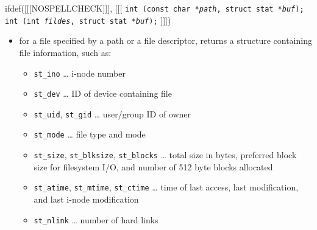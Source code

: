 

\begin{slide}
\setlength{\baselineskip}{0.9\baselineskip}
ifdef([[[NOSPELLCHECK]]], [[[
\texttt{int (const char *\emph{path}, struct stat *\emph{buf});\\
int (int \emph{fildes}, struct stat *\emph{buf});}
]]])
\begin{itemize}
\item for a file specified by a path or a file descriptor, returns a structure
containing file information, such as:
\begin{itemize}
\item \texttt{st\_ino} \dots{} i-node number
\item \texttt{st\_dev} \dots{} ID of device containing file
\item \texttt{st\_uid}, \texttt{st\_gid} \dots{} user/group ID of owner
\item \texttt{st\_mode} \dots{} file type and mode
\item \texttt{st\_size}, \texttt{st\_blksize}, \texttt{st\_blocks}
\dots{} total size in bytes, preferred block size for filesystem I/O,
and number of 512 byte blocks allocated
\item \texttt{st\_atime}, \texttt{st\_mtime}, \texttt{st\_ctime}
\dots{} time of last access, last modification, and last i-node modification
\item \texttt{st\_nlink} \dots{} number of hard links
\end{itemize}
\end{itemize}
\end{slide}

